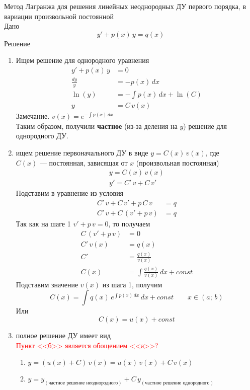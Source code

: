 \begin{Note}
Метод Лагранжа для решения линейных неоднородных ДУ первого порядка, в вариации произвольной постоянной\\
Дано
\[
    y'+p(x)\,y=q(x)
\]
Решение
    \begin{enumerate}
        \item Ищем решение для однородного уравнения
        \begin{align*}
            y'+p(x)\,y&=0\\
            \frac{dy}{y}&=-p(x)\,dx\\
            \ln(y)&=-\int p(x)\,dx+\ln(C)\\
            y&= C\,v(x)
        \end{align*}
        Замечание. $v(x)=e^{-\int p(x)\,dx}$\\
        Таким образом, получили \textbf{частное} (из-за деления на $y$) решение для однородного ДУ.
    
        \item ищем решение первоначального ДУ в виде $y=C(x)\,v(x)$, где\\ $C(x)$ --- постоянная, зависящая от $x$ (произвольная постоянная)
        \begin{align*}
            y = C(x)\,v(x)\\
            y'=C'\,v + C\,v'
        \end{align*}
        Подставим в уравнение из условия
        \begin{align*}  
            C'\,v+C\,v'+p\,C\,v&=q\\ 
            C'\,v+C\,(v'+p\,v)&=q
        \end{align*}
        Так как на шаге 1 $v'+p\,v = 0$, то получаем
        \begin{align*}
            C\,(v'+p\,v)&=0\\
            C'\,v(x) &= q(x)\\
            C'&=\frac{q(x)}{v(x)}\\
            C(x)&=\int \frac{q(x)}{v(x)}\,dx+const
        \end{align*}
        Подставим значение $v(x)$ из шага 1, получим
        \[
            C(x) = \int q(x)\,e^{\int p(x)\,dx}\,dx+const \qquad x \in (a;\,b)
        \]
        Или
        \[
            C(x) = u(x) + const
        \]
        \item полное решение ДУ имеет вид\\
        \textcolor{red}{Пункт <<б>> является обощением <<а>>?}
        \begin{enumerate}
            \item $y=(u(x) + C)\,v(x)=u(x)\,v(x)+C\,v(x)$
            \item $y=y_{(\text{частное решение неоднородного})} + C\,y_{(\text{частное решение однородного})}$
        \end{enumerate}
    \end{enumerate}
\end{Note}

